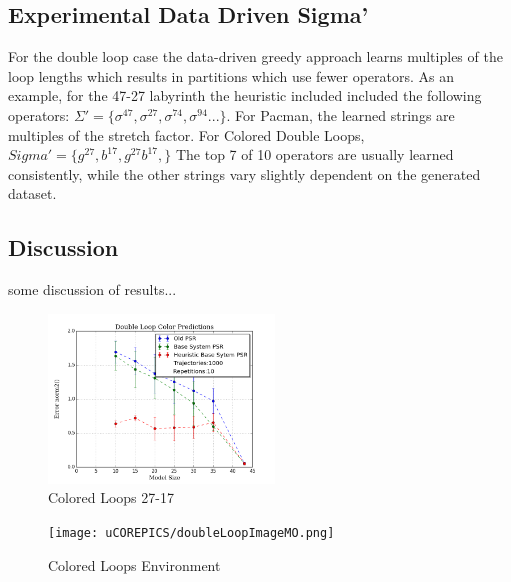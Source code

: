 \subsection{Experimental Data Driven Sigma'}
For the double loop case the data-driven greedy approach learns multiples of the loop lengths which results in partitions which use fewer operators. As an example, for the 47-27 labyrinth the heuristic included included the following operators: $\Sigma'=\{\sigma^{47}, \sigma^{27}, \sigma^{74}, \sigma^{94} ...\}$. For Pacman, the learned strings are multiples of the stretch factor. For Colored Double Loops, $Sigma' = \{g^{27},b^{17},g^{27}b^{17},\}$ The top 7 of 10 operators are usually learned consistently, while the other strings vary slightly dependent on the generated dataset.

\subsection{Discussion}

some discussion of results...

\begin{figure}[ht!]
\centering
\includegraphics[width=60mm]{uCOREPICS/MultipleObservationsHeuristics.png}
\caption{Colored Loops 27-17\label{overflow}}
\end{figure}

\begin{figure}[ht!]
\centering
\texttt{[image: uCOREPICS/doubleLoopImageMO.png]}
\caption{Colored Loops Environment\label{overflow}}
\end{figure}
